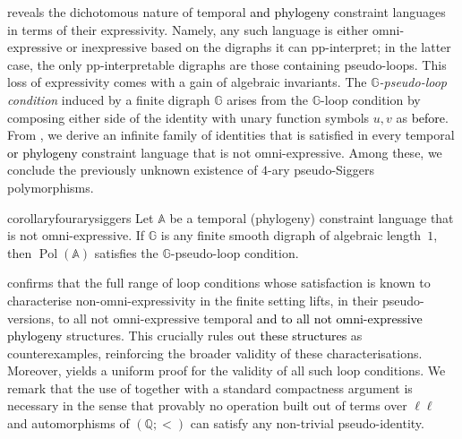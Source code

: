 \documentclass[a4paper,reqno, cleveref]{amsart}
\newcommand{\Q}{\mathbb{Q}}
\DeclareMathOperator{\Pol}{Pol}
\newcommand{\sA}{\mathbb A}
\newcommand{\sG}{\mathbb G}
\newcommand\jo[1]{\textcolor{black}{#1}} %
\begin{document}
 reveals the dichotomous nature of temporal \jo{and phylogeny} constraint languages in terms of their expressivity. Namely, any such language 
 is either omni-expressive or inexpressive based on the digraphs it can pp-interpret; in the latter
case, the only pp-interpretable digraphs are those containing pseudo-loops. This loss of expressivity comes with a gain of algebraic invariants.  
The \emph{$\sG$-pseudo-loop condition} induced by a finite digraph $\sG$ arises from the $\sG$-loop condition by composing either side of the identity with unary function symbols $u,v$ as \jo{before}. %
From , we derive an infinite family of identities that is satisfied in every  temporal \jo{or phylogeny} constraint language that is not omni-expressive. Among these, we conclude the previously unknown existence of $4$-ary 
pseudo-Siggers polymorphisms.


\begin{restatable}{corollary}{fourarysiggers}\label{corollary:siggers}
    Let $\sA$ be a temporal (phylogeny) constraint language that is not omni-expressive. If $\sG$ is any finite smooth digraph of algebraic length~$1$, then  $\Pol(\sA)$ satisfies the $\sG$-pseudo-loop condition.
\end{restatable}



 confirms that the full range of loop conditions whose satisfaction is known to characterise non-omni-expressivity in the finite setting lifts, in their pseudo-versions, to all not omni-expressive temporal \jo{and to all not omni-expressive phylogeny} structures. This crucially rules out \jo{these structures} %
as counterexamples, reinforcing the broader validity of these characterisations. Moreover,  yields a uniform proof for the validity of all such loop conditions. We remark that the use of  together with a standard compactness argument is necessary in the sense that provably no operation built out of terms over $\ell \ell$ and automorphisms of $(\Q; <)$ can satisfy any non-trivial pseudo-identity. 
\end{document}
